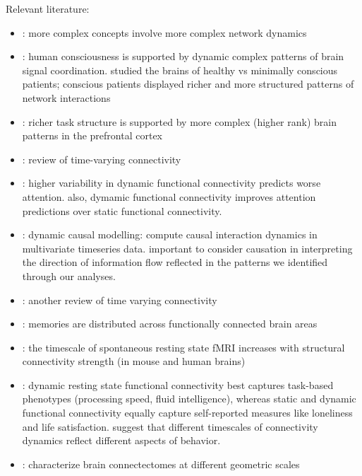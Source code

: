 \documentclass[english]{article}
\begin{document}
Relevant literature:
\begin{itemize}
\item \cite{SoloEtal19}: more complex concepts involve more complex network
dynamics

\item \cite{DemeEtal19}: human consciousness is supported by dynamic
complex patterns of brain signal coordination.  studied the brains of
healthy vs minimally conscious patients; conscious patients displayed
richer and more structured patterns of network interactions

\item \cite{MackEtal17}: richer task structure is supported by more complex (higher
rank) brain patterns in the prefrontal cortex

\item \cite{LuriEtal19}: review of time-varying connectivity

\item \cite{FongEtal18}: higher variability in dynamic functional connectivity
predicts worse attention.  also, dymamic functional connectivity
improves attention predictions over static functional connectivity.

\item \cite{ParkEtal17}: dynamic causal modelling: compute causal interaction
dynamics in multivariate timeseries data.  important to consider
causation in interpreting the direction of information flow reflected
in the patterns we identified through our analyses.

\item \cite{PretEtal17}: another review of time varying connectivity

\item \cite{RoyEtal19}: memories are distributed across functionally connected
brain areas

\item \cite{FallEtal19}: the timescale of spontaneous resting state
  fMRI increases with structural connectivity strength (in mouse and
  human brains)

\item \cite{LiegEtal19}: dynamic resting state functional connectivity best captures
task-based phenotypes (processing speed, fluid intelligence), whereas
static and dynamic functional connectivity equally capture
self-reported measures like loneliness and life satisfaction.  suggest
that different timescales of connectivity dynamics reflect different
aspects of behavior.

\item \cite{ZhenEtal19}: characterize brain connectectomes at different geometric
scales


\end{itemize}
\end{document}
